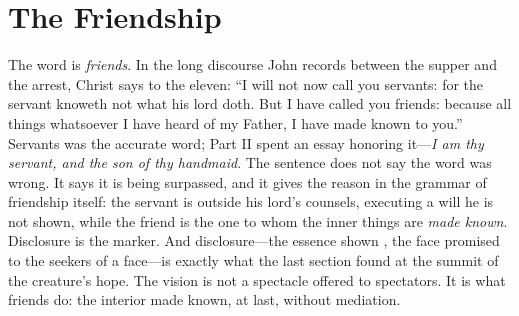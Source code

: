 \section{The Friendship}

The word is \emph{friends}. In the long discourse John records between the supper and the arrest, Christ says to the eleven: ``I will not now call you servants: for the servant knoweth not what his lord doth. But I have called you friends: because all things whatsoever I have heard of my Father, I have made known to you.'' Servants was the accurate word; Part II spent an essay honoring it---\emph{I am thy servant, and the son of thy handmaid}. The sentence does not say the word was wrong. It says it is being surpassed, and it gives the reason in the grammar of friendship itself: the servant is outside his lord's counsels, executing a will he is not shown, while the friend is the one to whom the inner things are \emph{made known}. Disclosure is the marker. And disclosure---the essence shown , the face promised to the seekers of a face---is exactly what the last section found at the summit of the creature's hope. The vision is not a spectacle offered to spectators. It is what friends do: the interior made known, at last, without mediation.

